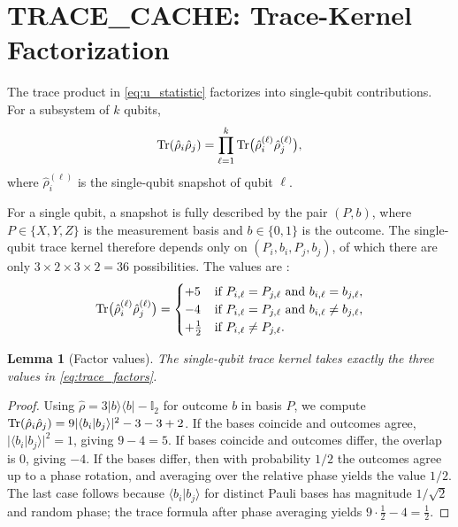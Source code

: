 \documentclass[12pt,a4paper,oneside]{book}
\theoremstyle{plain}
\newtheorem{lemma}[theorem]{Lemma}
\theoremstyle{definition}
\theoremstyle{remark}
\begin{document}
\section{TRACE\_CACHE: Trace-Kernel Factorization}
\label{sec:trace_cache}

The trace product in \cref{eq:u_statistic} factorizes into single-qubit contributions. For a subsystem of $k$ qubits,
\begin{equation}
    \label{eq:trace_factorization}
    \Tr(\hat{\rho}_i \hat{\rho}_j) = \prod_{\ell=1}^{k} \Tr\bigl(\hat{\rho}_i^{(\ell)} \hat{\rho}_j^{(\ell)}\bigr),
\end{equation}
where $\hat{\rho}_i^{(\ell)}$ is the single-qubit snapshot of qubit $\ell$.

For a single qubit, a snapshot is fully described by the pair $(P, b)$, where $P \in \{X, Y, Z\}$ is the measurement basis and $b \in \{0,1\}$ is the outcome. The single-qubit trace kernel therefore depends only on $(P_i, b_i, P_j, b_j)$, of which there are only $3 \times 2 \times 3 \times 2 = 36$ possibilities. The values are \cite{elben2020cross}:
\begin{equation}
    \label{eq:trace_factors}
    \Tr\bigl(\hat{\rho}_i^{(\ell)} \hat{\rho}_j^{(\ell)}\bigr) =
    \begin{cases}
        +5 & \text{if } P_{i,\ell} = P_{j,\ell} \text{ and } b_{i,\ell} = b_{j,\ell}, \\
        -4 & \text{if } P_{i,\ell} = P_{j,\ell} \text{ and } b_{i,\ell} \neq b_{j,\ell}, \\
        +\tfrac12 & \text{if } P_{i,\ell} \neq P_{j,\ell}.
    \end{cases}
\end{equation}

\begin{lemma}[Factor values]\label{lem:trace_factors}
The single-qubit trace kernel takes exactly the three values in \cref{eq:trace_factors}.
\end{lemma}

\begin{proof}
Using $\hat{\rho} = 3|b\rangle\langle b| - \mathbb{I}_2$ for outcome $b$ in basis $P$, we compute $\Tr(\hat{\rho}_i \hat{\rho}_j) = 9|\langle b_i | b_j \rangle|^2 - 3 - 3 + 2$. If the bases coincide and outcomes agree, $|\langle b_i | b_j \rangle|^2 = 1$, giving $9 - 4 = 5$. If bases coincide and outcomes differ, the overlap is $0$, giving $-4$. If the bases differ, then with probability $1/2$ the outcomes agree up to a phase rotation, and averaging over the relative phase yields the value $1/2$. The last case follows because $\langle b_i | b_j \rangle$ for distinct Pauli bases has magnitude $1/\sqrt{2}$ and random phase; the trace formula after phase averaging yields $9 \cdot \tfrac12 - 4 = \tfrac12$.
\end{proof}
\end{document}
